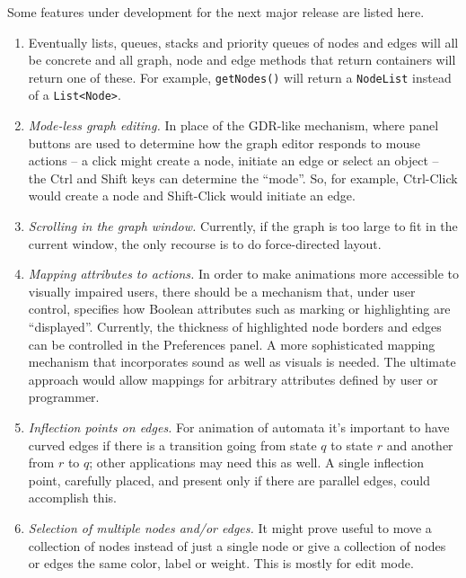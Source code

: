 Some features under development for the next major release are listed here.

\begin{enumerate}
\item \label{item:data_structures}
  Eventually
  lists, queues, stacks and priority queues of nodes and edges will all be
  concrete and all graph, node and edge methods that return containers will
  return one of these. For example, \texttt{getNodes()} will return a
  \texttt{NodeList} instead of a \texttt{List<Node>}.

\item
  \emph{Mode-less graph editing.}
  In place of the GDR-like mechanism, where panel buttons are used to determine
  how the graph editor responds to mouse actions -- a click might create a node,
  initiate an edge or select an object --
  the \textsf{Ctrl} and \textsf{Shift} keys can determine the ``mode''.
  So, for example, \textsf{Ctrl-Click} would create a node and
  \textsf{Shift-Click} would initiate an edge.

\item \emph{Scrolling in the graph window.} Currently, if the graph is too
  large to fit in the current window, the only recourse is to do
  force-directed layout.

\item
  \emph{Mapping attributes to actions.}
  In order to make animations more accessible to visually impaired users,
  there should be a mechanism that, under user control, specifies how Boolean
  attributes such as marking or highlighting are ``displayed''.
  Currently, the thickness of highlighted node borders and edges can be
  controlled in the \textsf{Preferences} panel.
  A more sophisticated mapping mechanism that incorporates sound as well as visuals is needed.
  The ultimate approach would allow mappings for arbitrary attributes
  defined by user or programmer.

\item \emph{Inflection points on edges.}  For animation of automata it's
  important to have curved edges if there is a transition going from state
  $q$ to state $r$ and another from $r$ to $q$; other applications may need
  this as well. A single inflection point, carefully placed, and present only
  if there are parallel edges, could accomplish this.

\item \emph{Selection of multiple nodes and/or edges.}  It might prove useful
  to move a collection of nodes instead of just a single node or give a
  collection of nodes or edges the same color, label or weight. This is
  mostly for edit mode.
\end{enumerate}
